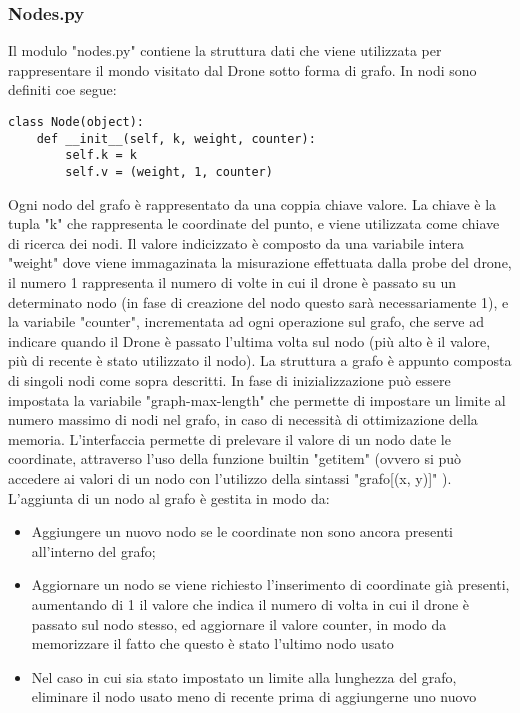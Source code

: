 \subsubsection{Nodes.py}
Il modulo "nodes.py" contiene la struttura dati che viene utilizzata per rappresentare il mondo visitato dal Drone sotto forma di grafo. In nodi sono definiti coe segue:
\begin{verbatim} 
class Node(object):
    def __init__(self, k, weight, counter):
        self.k = k
        self.v = (weight, 1, counter)
\end{verbatim}
Ogni nodo del grafo è rappresentato da una coppia chiave valore. La chiave è la tupla "k" che rappresenta le coordinate del punto, e viene utilizzata come chiave di ricerca dei nodi. Il valore indicizzato è composto da una variabile intera "weight" dove viene immagazinata la misurazione effettuata dalla probe del drone, il numero 1 rappresenta il numero di volte in cui il drone è passato su un determinato nodo (in fase di creazione del nodo questo sarà necessariamente 1), e la variabile "counter", incrementata ad ogni operazione sul grafo, che serve ad indicare quando il Drone è passato l'ultima volta sul nodo (più alto è il valore, più di recente è stato utilizzato il nodo). 
La struttura a grafo è appunto composta di singoli nodi come sopra descritti. In fase di inizializzazione può essere impostata la variabile "graph-max-length" che permette di impostare un limite al numero massimo di nodi nel grafo, in caso di necessità di ottimizazione della memoria. L'interfaccia permette di prelevare il valore di un nodo date le coordinate, attraverso l'uso della funzione builtin "getitem" (ovvero si può accedere ai valori di un nodo con l'utilizzo della sintassi "grafo[(x, y)]" ). L'aggiunta di un nodo al grafo è gestita in modo da:
\begin{itemize}
\item Aggiungere un nuovo nodo se le coordinate non sono ancora presenti all'interno del grafo;

\item Aggiornare un nodo se viene richiesto l'inserimento di coordinate già presenti, aumentando di 1 il valore che indica il numero di volta in cui il drone è passato sul nodo stesso, ed aggiornare il valore counter, in modo da memorizzare il fatto che questo è stato l'ultimo nodo usato

\item Nel caso in cui sia stato impostato un limite alla lunghezza del grafo, eliminare il nodo usato meno di recente prima di aggiungerne uno nuovo
\end{itemize}
